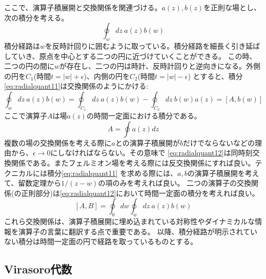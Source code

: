 \documentclass[11pt, aps, longbibliography]{article}
\numberwithin{equation}{section}
\begin{document}
        ここで、演算子積展開と交換関係を関連づける。$a(z),b(z)$を正則な場とし、次の積分を考える。
        \begin{equation}\label{eq:radialquant11}
            \oint_w dz \ a(z)b(w)
        \end{equation}
        積分経路は$w$を反時計回りに囲むように取っている。積分経路を細長く引き延ばしていき、原点を中心とする二つの円に近づけていくことができる。
        この時、二つの円の間に$w$が存在し、二つの円は時計、反時計回りと逆向きになる。外側の円を$C_1$(時間$t=|w|+\epsilon$)、内側の円を$C_2$(時間$t=|w|-\epsilon$)
        とすると、積分\eqref{eq:radialquant11}は交換関係のようにかける:
        \begin{equation}\label{eq:radialquant12}
            \oint_w dz \ a(z)b(w) = \oint_{C_1} dz \ a(z)b(w) - \oint_{C_2} dz \ b(w)a(z) = [A,b(w)]
        \end{equation}
        ここで演算子$A$は場$a(z)$の時間一定面における積分である。
        \begin{equation}\label{eq:radialquant13}
            A = \oint a(z)dz
        \end{equation}
        複数の場の交換関係を考える際に$a$との演算子積展開が$b$だけでならないなどの理由から、$\epsilon \rightarrow 0$にしなければならない。その意味で
        \eqref{eq:radialquant12}は同時刻交換関係である。またフェルミオン場を考える際には反交換関係にすれば良い。テクニカルには積分\eqref{eq:radialquant11}
        を求める際には、$a,b$の演算子積展開を考えて、留数定理から$1/(z-w)$の項のみを考えれば良い。
        二つの演算子の交換関係(の正則部分)は\eqref{eq:radialquant12}において時間一定面の積分を考えれば良い。
        \begin{equation}\label{eq:radialquant14}
            [A, B] = \oint_0 dw \oint_w dz \ a(z)b(w)
        \end{equation}
        これら交換関係は、演算子積展開に埋め込まれている対称性やダイナミカルな情報を演算子の言葉に翻訳する点で重要である。
        以降、積分経路が明示されていない積分は時間一定面の円で経路を取っているものとする。

    \subsection{Virasoro代数}
\end{document}
